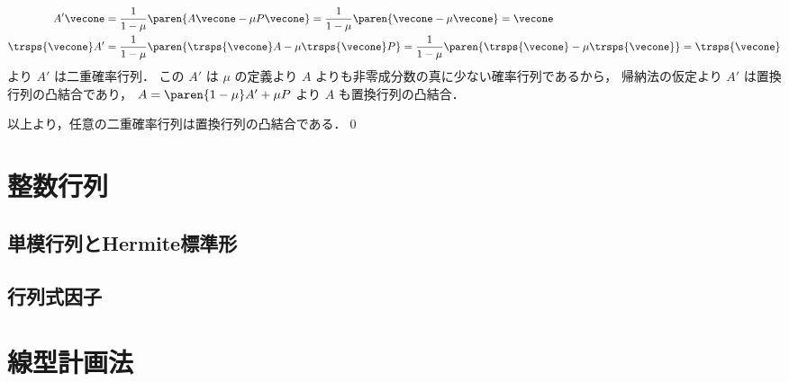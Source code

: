 \documentclass[a4paper]{jsarticle}
\begin{document}
{\begin{itemize}
        \begin{align*}
          A' \vecone
          &= \frac{1}{1 - \mu} \paren{A \vecone - \mu P \vecone}
          = \frac{1}{1 - \mu} \paren{\vecone - \mu \vecone}
          = \vecone
        \\
          \trsps{\vecone} A'
          &= \frac{1}{1 - \mu} \paren{\trsps{\vecone} A - \mu \trsps{\vecone} P}
          = \frac{1}{1 - \mu} \paren{\trsps{\vecone} - \mu \trsps{\vecone}}
          = \trsps{\vecone}
        \end{align*}
        より $A'$ は二重確率行列．
        この $A'$ は $\mu$ の定義より $A$ よりも非零成分数の真に少ない確率行列であるから，
        帰納法の仮定より $A'$ は置換行列の凸結合であり，
        $A = \paren{1 - \mu} A' + \mu P$ より $A$ も置換行列の凸結合．
      \end{itemize}
      以上より，任意の二重確率行列は置換行列の凸結合である．\qed
    }
\section{整数行列}
  \subsection{単模行列とHermite標準形}
    \plainpar{}{\REMAINS}
    \proof{}{\REMAINS}
    \proof{}{
      \REMAINS
    }
    \proof{}{
      \REMAINS
    }
    \plainpar{}{\REMAINS}
  \subsection{行列式因子}
\section{線型計画法}
\end{document}
